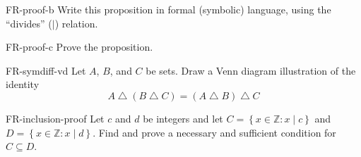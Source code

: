 \documentclass[letterpaper]{ngeexam}
\newcommand{\divides}{\mathbin{\vert}}
\newcommand{\symdiff}{\mathbin{\triangle}}
\begin{document}
{\begin{question}{FR-proof-b}
    Write this proposition in formal (symbolic) language, using the ``divides'' ($\divides$) relation.
\end{question}

\begin{question}{FR-proof-c}
     Prove the proposition.
\end{question}
\blankpage

\begin{question}{FR-symdiff-vd}
    Let $A$, $B$, and $C$ be sets.
    Draw a Venn diagram illustration of the identity
    \[
        A \symdiff (B \symdiff C) = (A \symdiff B) \symdiff C
    \]   
\end{question}


\begin{question}{FR-inclusion-proof}
    Let $c$ and $d$ be integers and let $C = \left\{ x \in \mathbb{Z} : x \mid c\right\}$ and $D = \left\{ x \in \mathbb{Z} : x \mid d\right\}$.
    Find and prove a necessary and sufficient condition for $C \subseteq D$.        
\end{question}
\blankpage

}
\end{document}
